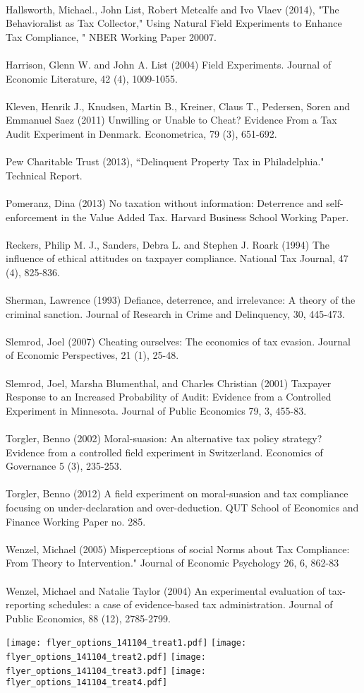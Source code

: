 \documentclass[12pt,titlepage]{article}
\begin{document}
\\
Hallsworth, Michael., John List, Robert Metcalfe and Ivo Vlaev (2014), "The Behavioralist as Tax Collector,"
Using Natural Field Experiments to Enhance Tax Compliance, " NBER Working Paper 20007. \\
\\
Harrison, Glenn W. and John A. List (2004) Field Experiments. Journal of Economic Literature, 42 (4),
1009-1055.\\ 
\\
Kleven, Henrik J., Knudsen, Martin B., Kreiner, Claus T., Pedersen, Soren and Emmanuel Saez (2011)
Unwilling or Unable to Cheat? Evidence From a Tax Audit Experiment in Denmark.
Econometrica, 79 (3), 651-692. \\
\\
Pew Charitable Trust (2013), ``Delinquent Property Tax in Philadelphia." Technical Report. \\
\\
Pomeranz, Dina (2013) No taxation without information: Deterrence and self-enforcement in the Value
Added Tax. Harvard Business School Working Paper. \\
\\
Reckers, Philip M. J., Sanders, Debra L. and Stephen J. Roark (1994) The influence of ethical attitudes on
taxpayer compliance. National Tax Journal, 47 (4), 825-836. \\
\\
Sherman, Lawrence (1993) Defiance, deterrence, and irrelevance: A theory of the criminal sanction.
Journal of Research in Crime and Delinquency, 30,  445-473. \\
\\ 
Slemrod, Joel (2007) Cheating ourselves: The economics of tax evasion. Journal of Economic
Perspectives, 21 (1), 25-48. \\
\\
Slemrod, Joel, Marsha Blumenthal, and Charles Christian (2001) Taxpayer Response to an Increased Probability of Audit: Evidence from a Controlled Experiment in Minnesota. Journal of Public Economics 79, 3, 455-83.\\
\\
Torgler, Benno (2002) Moral-suasion: An alternative tax policy strategy? Evidence from a controlled field
experiment in Switzerland. Economics of Governance 5 (3), 235-253. \\
\\
Torgler, Benno (2012) A field experiment on moral-suasion and tax compliance focusing on under-declaration
and over-deduction. QUT School of Economics and Finance Working Paper no. 285. \\
\\
Wenzel, Michael (2005) Misperceptions of social Norms about Tax Compliance: From Theory to Intervention." Journal of Economic Psychology 26, 6, 862-83\\
\\
Wenzel, Michael and Natalie Taylor (2004) An experimental evaluation of tax-reporting schedules: a case of
evidence-based tax administration. Journal of Public Economics, 88 (12), 2785-2799.







\newpage

\texttt{[image: flyer\_options\_141104\_treat1.pdf]}
\newpage
\texttt{[image: flyer\_options\_141104\_treat2.pdf]}
\newpage
\texttt{[image: flyer\_options\_141104\_treat3.pdf]}
\newpage
\texttt{[image: flyer\_options\_141104\_treat4.pdf]}
\end{document}
